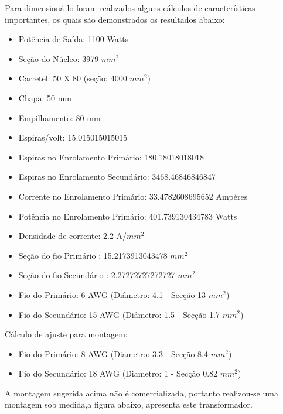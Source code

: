 	Para dimensioná-lo  foram realizados alguns cálculos de características importantes, os quais são demonstrados os resultados abaixo:
	\begin{itemize}
		\item Potência de Saída: 1100 Watts
		\item Seção do Núcleo: 3979 $mm^2$
		\item Carretel: 50 X 80 (seção: 4000 $mm^2$)
		\item Chapa: 50 mm
		\item Empilhamento: 80 mm
		\item Espiras/volt: 15.015015015015
		\item Espiras no Enrolamento Primário: 180.18018018018
		\item Espiras no Enrolamento Secundário: 3468.46846846847
		\item Corrente no Enrolamento Primário: 33.4782608695652 Ampéres
		\item Potência no Enrolamento Primário: 401.739130434783 Watts
		\item Densidade de corrente: 2.2 A/$mm^2$
		\item Seção do fio Primário : 15.2173913043478 $mm^2$
		\item Seção do fio Secundário : 2.27272727272727 $mm^2$
		\item Fio do Primário: 6 AWG (Diâmetro: 4.1 - Secção 13 $mm^2$)
		\item Fio do Secundário: 15 AWG (Diâmetro: 1.5 - Secção 1.7 $mm^2$)
		
	\end{itemize}
	
	Cálculo de ajuste para montagem:
	\begin{itemize}
		\item Fio do Primário: 8 AWG (Diametro: 3.3 - Secção 8.4 $mm^2$)
		\item Fio do Secundário: 18 AWG (Diametro: 1 - Secção 0.82 $mm^2$)
		
	\end{itemize}
	
A montagem sugerida acima não é comercializada, portanto realizou-se uma montagem sob medida,a figura abaixo, apresenta este transformador.
	

